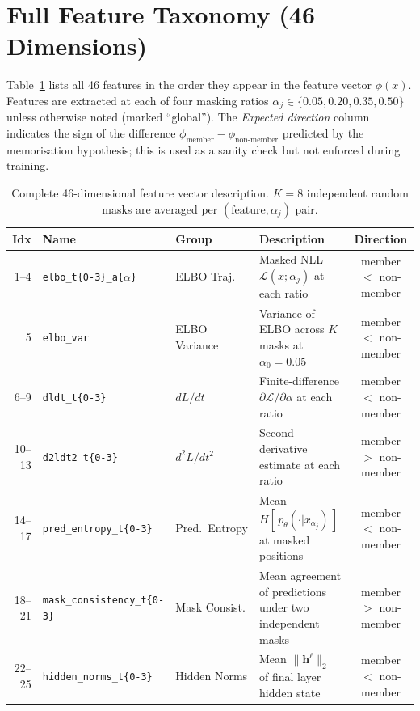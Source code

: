 \section{Full Feature Taxonomy (46 Dimensions)}
\label{app:features}

Table~\ref{tab:features} lists all 46 features in the order they appear in the
feature vector $\phi(x)$.  Features are extracted at each of four masking ratios
$\alpha_j \in \{0.05, 0.20, 0.35, 0.50\}$ unless otherwise noted (marked ``global'').
The \emph{Expected direction} column indicates the sign of the difference
$\phi_{\text{member}} - \phi_{\text{non-member}}$ predicted by the memorisation
hypothesis; this is used as a sanity check but not enforced during training.

\begin{table}[h]
\centering
\caption{Complete 46-dimensional feature vector description.
         $K=8$ independent random masks are averaged per $(\text{feature}, \alpha_j)$ pair.}
\label{tab:features}
\small
\begin{tabular}{r l l p{4.5cm} c}
\toprule
\textbf{Idx} & \textbf{Name} & \textbf{Group} & \textbf{Description} & \textbf{Direction} \\
\midrule
1--4   & \texttt{elbo\_t\{0-3\}\_a\{$\alpha$\}} & ELBO Traj.       & Masked NLL $\mathcal{L}(x;\alpha_j)$ at each ratio                     & member $<$ non-member \\
5      & \texttt{elbo\_var}                       & ELBO Variance    & Variance of ELBO across $K$ masks at $\alpha_0=0.05$                    & member $<$ non-member \\
6--9   & \texttt{dldt\_t\{0-3\}}                 & $dL/dt$          & Finite-difference $\partial\mathcal{L}/\partial\alpha$ at each ratio    & member $<$ non-member \\
10--13 & \texttt{d2ldt2\_t\{0-3\}}               & $d^2L/dt^2$      & Second derivative estimate at each ratio                                 & member $>$ non-member \\
14--17 & \texttt{pred\_entropy\_t\{0-3\}}         & Pred.\ Entropy   & Mean $H[\,p_\theta(\cdot|x_{\alpha_j})\,]$ at masked positions          & member $<$ non-member \\
18--21 & \texttt{mask\_consistency\_t\{0-3\}}     & Mask Consist.    & Mean agreement of predictions under two independent masks                & member $>$ non-member \\
22--25 & \texttt{hidden\_norms\_t\{0-3\}}         & Hidden Norms     & Mean $\|\mathbf{h}^{\ell}\|_2$ of final layer hidden state              & member $<$ non-member \\

\end{tabular}
\end{table}

